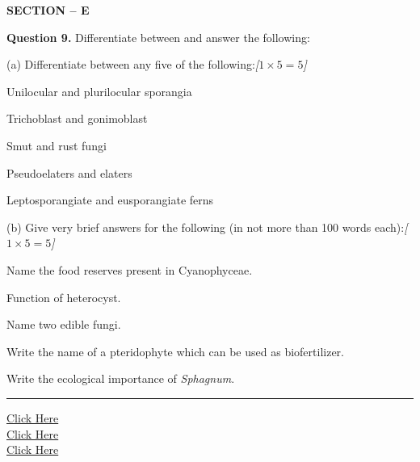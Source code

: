 \documentclass[11pt,a4paper]{article}
\newcommand{\pts}[1]{\hfill   \textit{[#1]}}
\begin{document}
\pagebreak

\begin{center}
   \textbf{SECTION -- E}
\end{center}

\medskip


\noindent   \textbf{Question 9.} Differentiate between and answer the following:

\smallskip



\noindent (a) Differentiate between any five of the following:\pts{$1  \times 5 = 5$}

\begin{parts}
  \item Unilocular and plurilocular sporangia
  \item Trichoblast and gonimoblast
  \item Smut and rust fungi
  \item Pseudoelaters and elaters
  \item Leptosporangiate and eusporangiate ferns
\end{parts}

\smallskip



\noindent (b) Give very brief answers for the following (in not more than 100 words each):\pts{$1  \times 5 = 5$}

\begin{parts}
  \item Name the food reserves present in Cyanophyceae.
  \item Function of heterocyst.
  \item Name two edible fungi.
  \item Write the name of a pteridophyte which can be used as biofertilizer.
  \item Write the ecological importance of   \textit{Sphagnum}.
\end{parts}

\vfill
\rule{\linewidth}{0.4pt}

\begin{center}\small
\href{https://bhu-exam.vercel.app/}{Click Here}\\[4pt]\href{https://me-aryan.vercel.app/}{Click Here}\\[4pt]\href{https://quashan-me.vercel.app/}{Click Here}
\end{center}
\end{document}
